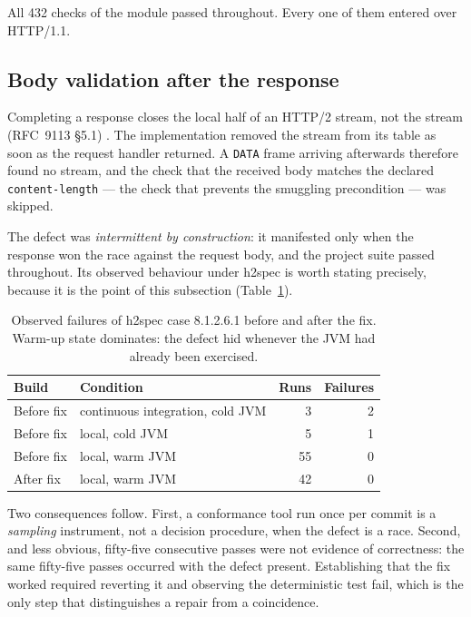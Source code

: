 \documentclass[preprint,12pt]{elsarticle}
\begin{document}
All 432 checks of the module passed throughout. Every one of them entered over
HTTP/1.1.

\subsection{Body validation after the response}

Completing a response closes the local half of an HTTP/2 stream, not the stream
(RFC~9113 §5.1) \cite{rfc9113}. The implementation removed the stream from its
table as soon as the request handler returned. A \texttt{DATA} frame arriving
afterwards therefore found no stream, and the check that the received body
matches the declared \texttt{content-length} --- the check that prevents the
smuggling precondition --- was skipped.

The defect was \emph{intermittent by construction}: it manifested only when the
response won the race against the request body, and the project suite passed
throughout. Its observed behaviour under h2spec is worth stating precisely,
because it is the point of this subsection
(Table~\ref{tab:intermittent}).

\begin{table}[ht]
\centering
\caption{Observed failures of h2spec case 8.1.2.6.1 before and after the fix.
         Warm-up state dominates: the defect hid whenever the JVM had already
         been exercised.}
\label{tab:intermittent}
\begin{tabular}{llrr}
\toprule
Build & Condition & Runs & Failures \\
\midrule
Before fix & continuous integration, cold JVM & 3  & 2 \\
Before fix & local, cold JVM                  & 5  & 1 \\
Before fix & local, warm JVM                  & 55 & 0 \\
After fix  & local, warm JVM                  & 42 & 0 \\
\bottomrule
\end{tabular}
\end{table}

Two consequences follow. First, a conformance tool run once per commit is a
\emph{sampling} instrument, not a decision procedure, when the defect is a
race. Second, and less obvious, fifty-five consecutive passes were not evidence
of correctness: the same fifty-five passes occurred with the defect present.
Establishing that the fix worked required reverting it and observing the
deterministic test fail, which is the only step that distinguishes a repair from
a coincidence.
\end{document}
